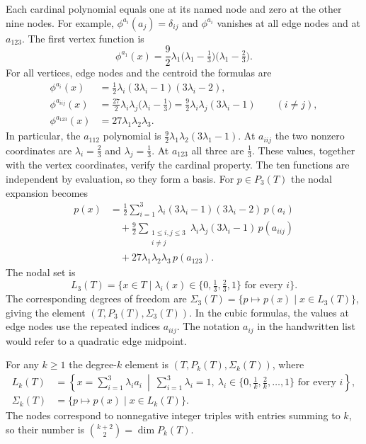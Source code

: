 \documentclass[11pt,a4paper]{article}
\begin{document}
Each cardinal polynomial equals one at its named node and zero at the other nine nodes. For example, \(\phi^{a_i}(a_j)=\delta_{ij}\) and \(\phi^{a_i}\) vanishes at all edge nodes and at \(a_{123}\). The first vertex function is
\[
 \phi^{a_1}(x)=\frac92\lambda_1\bigl(\lambda_1-\tfrac13\bigr)
                           \bigl(\lambda_1-\tfrac23\bigr).
\]
For all vertices, edge nodes and the centroid the formulas are
\begin{align*}
 \phi^{a_i}(x)
  &=\tfrac12\lambda_i(3\lambda_i-1)(3\lambda_i-2),\\
 \phi^{a_{iij}}(x)
  &=\tfrac{27}{2}\lambda_i\lambda_j\bigl(\lambda_i-\tfrac13\bigr)
   =\tfrac92\lambda_i\lambda_j(3\lambda_i-1)
    \qquad(i\ne j),\\
 \phi^{a_{123}}(x)&=27\lambda_1\lambda_2\lambda_3 .
\end{align*}
In particular, the \(a_{112}\) polynomial is \(\tfrac92\lambda_1\lambda_2(3\lambda_1-1)\). At \(a_{iij}\) the two nonzero coordinates are \(\lambda_i=\tfrac23\) and \(\lambda_j=\tfrac13\). At \(a_{123}\) all three are \(\tfrac13\). These values, together with the vertex coordinates, verify the cardinal property. The ten functions are independent by evaluation, so they form a basis. For \(p\in P_3(T)\) the nodal expansion becomes
\begin{align*}
 p(x)
 &=\tfrac12\sum_{i=1}^3\lambda_i(3\lambda_i-1)(3\lambda_i-2)\,p(a_i)\\
 &\quad+\tfrac92\sum_{\substack{1\leq i,j\leq3\\i\ne j}}
      \lambda_i\lambda_j(3\lambda_i-1)\,p(a_{iij})\\
 &\quad+27\lambda_1\lambda_2\lambda_3\,p(a_{123}).
\end{align*}
The nodal set is
\[
 L_3(T)=\{x\in T\mid\lambda_i(x)\in\{0,\tfrac13,\tfrac23,1\}
                                \text{ for every }i\}.
\]
The corresponding degrees of freedom are \(\Sigma_3(T)=\{p\mapsto p(x)\mid x\in L_3(T)\}\), giving the element \((T,P_3(T),\Sigma_3(T))\). In the cubic formulas, the values at edge nodes use the repeated indices \(a_{iij}\). The notation \(a_{ij}\) in the handwritten list would refer to a quadratic edge midpoint.

For any \(k\geq1\) the degree-\(k\) element is \((T,P_k(T),\Sigma_k(T))\), where
\begin{align*}
 L_k(T)
  &=\left\{x=\sum_{i=1}^3\lambda_i a_i\ \middle|\
       \sum_{i=1}^3\lambda_i=1,\ 
       \lambda_i\in\{0,\tfrac1k,\tfrac2k,\ldots,1\}
       \text{ for every }i\right\},\\
 \Sigma_k(T)&=\{p\mapsto p(x)\mid x\in L_k(T)\}.
\end{align*}
The nodes correspond to nonnegative integer triples with entries summing to \(k\), so their number is \(\binom{k+2}{2}=\dim P_k(T)\).
\end{document}
